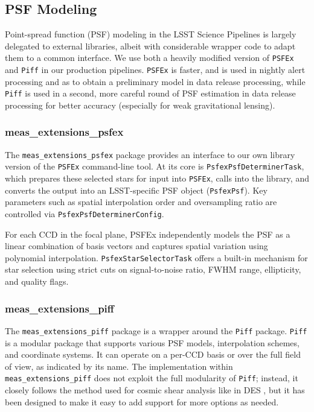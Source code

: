\subsection{PSF Modeling}

Point-spread function (PSF) modeling in the LSST Science Pipelines is largely delegated to external libraries, albeit with considerable wrapper code to adapt them to a common interface.
We use both a heavily modified version of \texttt{PSFEx} \citep{2011ASPC..442..435B} and \texttt{Piff} \citep{2021ascl.soft02024J,2021MNRAS.501.1282J} in our production pipelines.
\texttt{PSFEx} is faster, and is used in nightly alert processing and as to obtain a preliminary model in data release processing, while \texttt{Piff} is used in a second, more careful round of PSF estimation in data release processing for better accuracy (especially for weak gravitational lensing).

\subsubsection{meas\_extensions\_psfex}\label{sec:meas_extensions_psfex}

The \texttt{meas\_extensions\_psfex} package provides an interface to our own library version of the \texttt{PSFEx} command-line tool.
At its core is \texttt{PsfexPsfDeterminerTask}, which prepares these selected stars for input into \texttt{PSFEx}, calls into the library, and converts the output into an LSST-specific PSF object (\texttt{PsfexPsf}).
Key parameters such as spatial interpolation order and oversampling ratio are controlled via \texttt{PsfexPsfDeterminerConfig}.

For each CCD in the focal plane, PSFEx independently models the PSF as a linear combination of basis vectors and captures spatial variation using polynomial interpolation.
\texttt{PsfexStarSelectorTask} offers a built-in mechanism for star selection using strict cuts on signal-to-noise ratio, FWHM range, ellipticity, and quality flags.

\subsubsection{meas\_extensions\_piff}
\label{sec:meas_extensions_piff}

The \texttt{meas\_extensions\_piff} package is a wrapper around the \texttt{Piff} package.
\texttt{Piff} is a modular package that supports various PSF models, interpolation schemes, and coordinate systems.
It can operate on a per-CCD basis or over the full field of view, as indicated by its name.
The implementation within  \texttt{meas\_extensions\_piff} does not exploit the full modularity of \texttt{Piff}; instead, it closely follows the method used for cosmic shear analysis like in DES \citep{2021MNRAS.501.1282J,2025OJAp....8E..26S}, but it has been designed to make it easy to add support for more options as needed.

